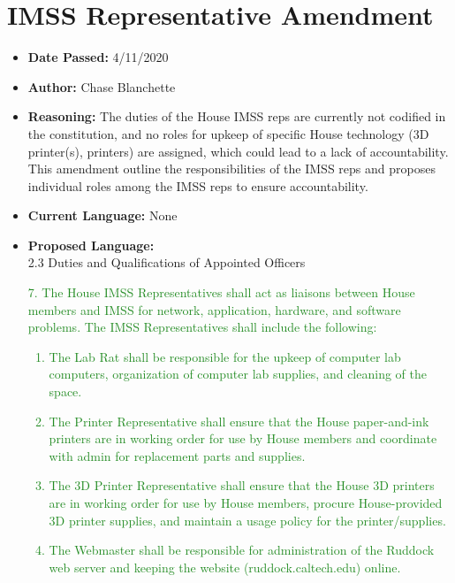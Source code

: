 \documentclass[10pt]{article} %
\begin{document}
\section{IMSS Representative Amendment}

\begin{itemize}
	\item \textbf{Date Passed:} 4/11/2020
	\item \textbf{Author:} Chase Blanchette
	\item \textbf{Reasoning:} The duties of the House IMSS reps are currently not codified in the constitution, and no roles for upkeep of specific House technology (3D printer(s), printers) are assigned, which could lead to a lack of accountability. This amendment outline the responsibilities of the IMSS reps and proposes individual roles among the IMSS reps to ensure accountability. 
	\item \textbf{Current Language:} None
	\item \textbf{Proposed Language:} \\
	2.3 Duties and Qualifications of Appointed Officers \\
	\textcolor{ForestGreen}{
	7. The House IMSS Representatives shall act as liaisons between House members and IMSS for network, application, hardware, and software problems. The IMSS Representatives shall include the following: 
	\begin{enumerate}[label=(\alph*)]
		\item The Lab Rat shall be responsible for the upkeep of computer lab computers, organization of computer lab supplies, and cleaning of the space.
		\item The Printer Representative shall ensure that the House paper-and-ink printers are in working order for use by House members and coordinate with admin for replacement parts and supplies.
		\item The 3D Printer Representative shall ensure that the House 3D printers are in working order for use by House members, procure House-provided 3D printer supplies, and maintain a usage policy for the printer/supplies.
		\item The Webmaster shall be responsible for administration of the Ruddock web server and keeping the website (ruddock.caltech.edu) online.
	\end{enumerate}
	}
	
\end{itemize}
\end{document}
